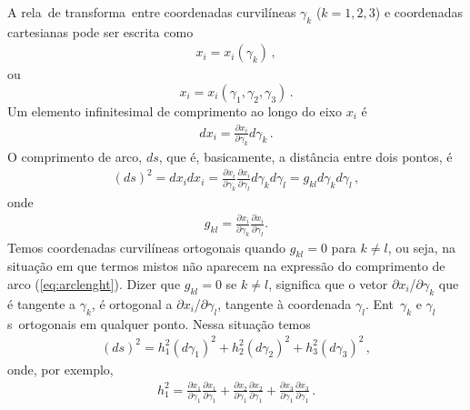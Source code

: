 A rela\cao\ de transforma\cao\ entre coordenadas curvil\'ineas
$\gamma_{k}$ ($k = 1,2,3$) e coordenadas cartesianas pode ser
escrita como
\begin{eqnarray}
x_{i} = x_{i}(\gamma_{k}) \, ,
\end{eqnarray}
ou
\begin{equation}
x_{i} = x_{i}(\gamma_{1}, \gamma_{2}, \gamma_{3})\, .
\end{equation}
Um elemento infinitesimal de comprimento ao longo do eixo $x_{i}$ \'e
\begin{eqnarray}
  dx_{i} = \frac{\partial x_{i}}{\partial \gamma_{k}}d\gamma_{k}\, .
\end{eqnarray}
O comprimento de arco, $ds$, que \'e, basicamente, a dist\^ancia entre
dois pontos, \'e
\begin{eqnarray}
(ds)^{2} = dx_{i}dx_{i} = \frac{\partial x_{i}}{\partial
\gamma_{k}}\frac{\partial x_{i}}{\partial
\gamma_{l}}d\gamma_{k}d\gamma_{l} = g_{kl}d\gamma_{k}d\gamma_{l}\, ,
\label{eq:arclenght}
\end{eqnarray}
onde
\begin{eqnarray}
g_{kl} = \frac{\partial x_{i}}{\partial \gamma_{k}}\frac{\partial
x_{i}}{\partial \gamma_{l}}.
\end{eqnarray}
Temos coordenadas curvil\'ineas ortogonais quando $g_{kl} = 0$ para $k \neq l$,
ou seja, na situa\c{c}\~ao em que termos mistos n\~ao aparecem na express\~ao
do comprimento de arco (\ref{eq:arclenght}). Dizer que $g_{kl} = 0$ se $k \neq
l$, significa que
o vetor $\partial x_{i}$/$ \partial \gamma_{k}$ que \'e tangente a
$\gamma_{k}$, \'e ortogonal a $\partial x_{i}$/$\partial
\gamma_{l}$, tangente \`a coordenada $\gamma_{l}$. Ent\ao\
$\gamma_{k}$ e $\gamma_{l}$ s\ao\ ortogonais em qualquer ponto.
Nessa situa\c{c}\~ao temos
\begin{eqnarray}
(ds)^{2} = h_{1}^{2}(d\gamma_{1})^{2} + h_{2}^{2}(d\gamma_{2})^{2}
+ h_{3}^{2}(d\gamma_{3})^{2}\, ,
\end{eqnarray}
onde, por exemplo,
\begin{eqnarray}
  h_{1}^{2} = \frac{\partial x_{1}}{\partial
 \gamma_{1}}\frac{\partial x_{1}}{\partial \gamma_{1}} +
 \frac{\partial x_{2}}{\partial \gamma_{1}}\frac{\partial
 x_{2}}{\partial \gamma_{1}} + \frac{\partial x_{3}}{\partial
\gamma_{1}}\frac{\partial x_{3}}{\partial \gamma_{1}}\, .
\end{eqnarray}
